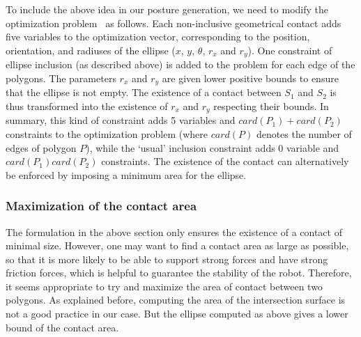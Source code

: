 To include the above idea in our posture generation, we need to modify the optimization problem~ as follows.
Each non-inclusive geometrical contact adds five variables to the optimization vector, corresponding to the position, orientation, and radiuses of the ellipse ($x$, $y$, $\theta$, $r_x$ and $r_y$).
One constraint of ellipse inclusion (as described above) is added to the problem for each edge of the polygons.
The parameters $r_x$ and $r_y$ are given lower positive bounds to ensure that the ellipse is not empty.
The existence of a contact between $S_1$ and $S_2$ is thus transformed into the existence of $r_x$ and $r_y$ respecting their bounds.
In summary, this kind of constraint adds 5 variables and $card(P_1)+card(P_2)$ constraints to the optimization problem (where $card(P)$ denotes the number of edges of polygon $P$), while the `usual' inclusion constraint adds 0 variable and $card(P_1)card(P_2)$ constraints.
The existence of the contact can alternatively be enforced by imposing a minimum area for the ellipse.



\subsubsection{Maximization of the contact area}
\label{subsubsec:optim-ellipse-area}


The formulation in the above section only ensures the existence of a contact of minimal size.
However, one may want to find a contact area as large as possible, so that it is more likely to be able to support strong forces and have strong friction forces, which is helpful to guarantee the stability of the robot.
Therefore, it seems appropriate to try and maximize the area of contact between two polygons.
As explained before, computing the area of the intersection surface is not a good practice in our case.
But the ellipse computed as above gives a lower bound of the contact area.

